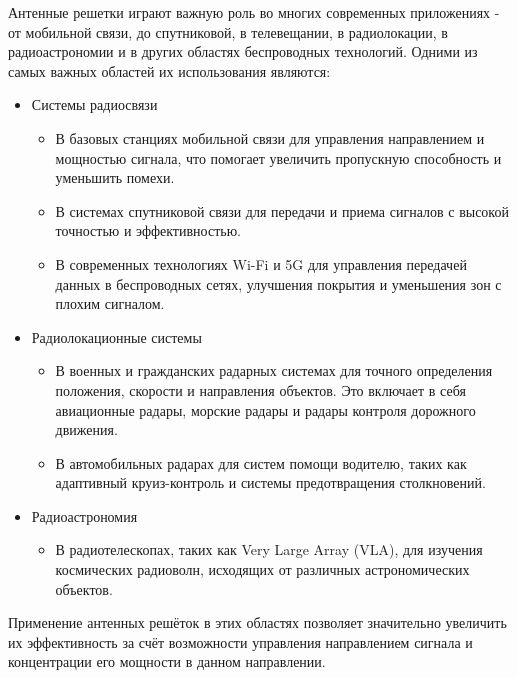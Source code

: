 \label{chap:introduction}

Антенные решетки играют важную роль во многих современных приложениях - от мобильной связи, до спутниковой,
в телевещании, в радиолокации, в радиоастрономии и в других областях беспроводных технологий.
Одними из самых важных областей их использования являются:

\begin{itemize}
    \item Системы радиосвязи
        \begin{itemize}
            \item В базовых станциях мобильной связи для управления направлением и мощностью сигнала, что помогает
            увеличить пропускную способность и уменьшить помехи.
            \item В системах спутниковой связи для передачи и приема сигналов с высокой точностью и эффективностью.
            \item В современных технологиях Wi-Fi и 5G для управления передачей данных в беспроводных сетях,
            улучшения покрытия и уменьшения зон с плохим сигналом.
        \end{itemize}
    \item Радиолокационные системы
    \begin{itemize}
        \item В военных и гражданских радарных системах для точного определения положения,
        скорости и направления объектов. Это включает в себя авиационные радары, морские радары
        и радары контроля дорожного движения.
        \item В автомобильных радарах для систем помощи водителю, таких как адаптивный круиз-контроль
        и системы предотвращения столкновений.
    \end{itemize}
    \item Радиоастрономия
    \begin{itemize}
        \item В радиотелескопах, таких как Very Large Array (VLA), для изучения космических радиоволн,
        исходящих от различных астрономических объектов.
    \end{itemize}
  \end{itemize}

Применение антенных решёток в этих областях позволяет значительно увеличить их эффективность за счёт возможности
управления направлением сигнала и концентрации его мощности в данном направлении.

